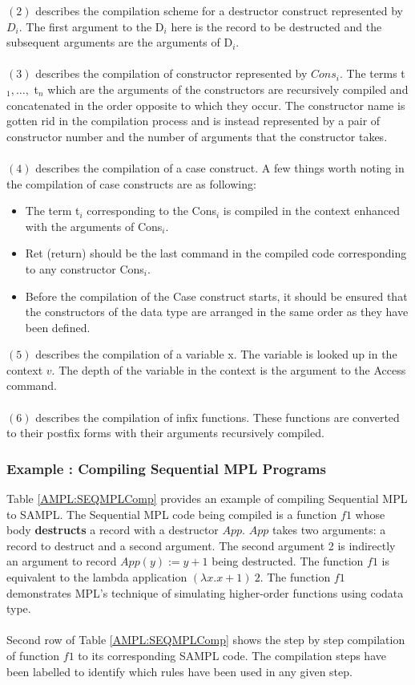 \documentclass[11pt]{article}
\newcommand{\<}{\langle}
\renewcommand{\>}{\rangle}
\begin{document}
$(2)$ describes the compilation scheme for a {\sf destructor} construct represented by $D_i$. The first argument to the {\sf D$_i$} here is the record to be destructed and the subsequent arguments are the arguments of {\sf D$_i$}. 
~~\\~~\\ 
$(3)$ describes the compilation of {\sf constructor} represented by $Cons_i$. The terms {\sf t$_1,\ldots,$ t$_n$} which are the arguments of the constructors are recursively compiled and concatenated in the order opposite to which they occur. The constructor name is gotten rid in the compilation process and is instead represented by a pair of constructor number and the number of arguments that the constructor takes.
~~\\~~\\
$(4)$ describes the compilation of a {\sf case} construct. A few things worth noting in the compilation of {\sf case} constructs are as following:
\begin {itemize}
\item The term {\sf t$_i$} corresponding to the {\sf Cons$_i$} is compiled in the context enhanced with the arguments of {\sf Cons$_i$}.
\item {\sf Ret (return)} should be the last command in the compiled code corresponding to any constructor {\sf Cons$_i$}.
\item Before the compilation of the {\sf Case} construct starts, it should be ensured that the constructors of the data type are arranged in the same order as they have been defined.
\end{itemize}
$(5)$ describes the compilation of a {\sf variable x}. The variable is looked up in the context $v$. The depth of the variable in the context is the argument to the {\sf Access} command.
~~\\~~\\
$(6)$ describes the compilation of infix functions. These functions are converted to their postfix forms with their arguments recursively compiled.

\subsubsection {Example : Compiling Sequential MPL Programs}
Table \ref {AMPL:SEQMPLComp} provides an example of compiling Sequential MPL to SAMPL. The Sequential MPL code being compiled is a function $f1$ whose body {\bf destructs} a {\sf record} with a {\sf destructor} $App$. $App$ takes two arguments: a {\sf record} to destruct and a second argument. The second argument 2 is indirectly an argument to {\sf record} $App(y) := y + 1$ being destructed. The function $f1$ is equivalent to the lambda application $(\lambda x.x+1)~2$. The function $f1$ demonstrates MPL's technique of simulating higher-order functions using codata type.
~~\\~~\\
Second row of Table \ref {AMPL:SEQMPLComp} shows the step by step compilation of function $f1$ to its corresponding SAMPL code. The compilation steps have been labelled to identify which rules have been used in any given step.
\end{document}
